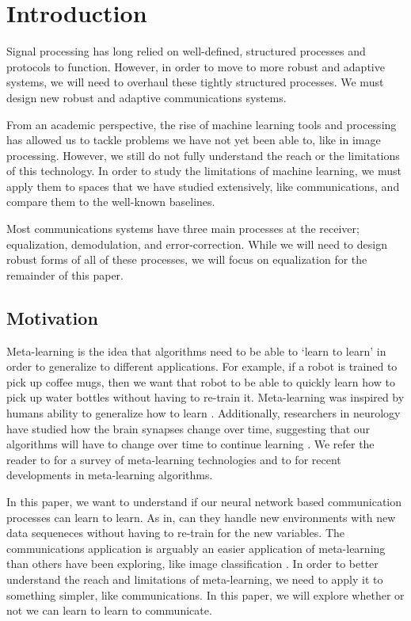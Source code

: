 \chapter{Introduction}

Signal processing has long relied on well-defined, structured processes and protocols to function.  However, in order to move to more robust and adaptive systems, we will need to overhaul these tightly structured processes.  We must design new robust and adaptive communications systems.

From an academic perspective, the rise of machine learning tools and processing has allowed us to tackle problems we have not yet been able to, like in image processing.  However, we still do not fully understand the reach or the limitations of this technology.  In order to study the limitations of machine learning, we must apply them to spaces that we have studied extensively, like communications, and compare them to the well-known baselines.

Most communications systems have three main processes at the receiver; equalization, demodulation, and error-correction.  While we will need to design robust forms of all of these processes, we will focus on equalization for the remainder of this paper. 

\section{Motivation}

Meta-learning is the idea that algorithms need to be able to `learn to learn' in order to generalize to different applications.  For example, if a robot is trained to pick up coffee mugs, then we want that robot to be able to quickly learn how to pick up water bottles without having to re-train it.  
Meta-learning was inspired by humans ability to generalize how to learn \cite{lake}.  
Additionally, researchers in neurology have studied how the brain synapses change over time, suggesting that our algorithms will have to change over time to continue learning \cite{bengio}.
We refer the reader to \cite{lemke} for a survey of meta-learning technologies and to \cite{finn} for recent developments in meta-learning algorithms.

In this paper, we want to understand if our neural network based communication processes can learn to learn.  
As in, can they handle new environments with new data sequeneces without having to re-train for the new variables. 
The communications application is arguably an easier application of meta-learning than others have been exploring, like image classification \cite{khodadeh}.  
In order to better understand the reach and limitations of meta-learning, we need to apply it to something simpler, like communications.  In this paper, we will explore whether or not we can learn to learn to communicate. 

